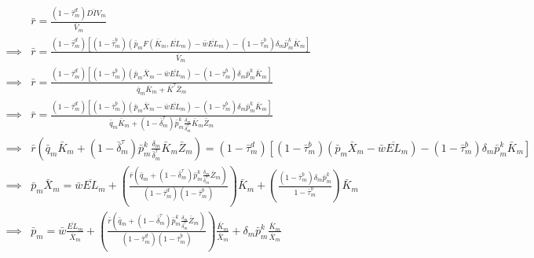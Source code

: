 \documentclass[letterpaper,12pt]{article}
\theoremstyle{definition}
\begin{document}
\begin{spacing}{1.5}
 \begin{equation}
 \label{eqn:p_dynamic_tax_ss}
\begin{split}
& \bar{r}  =  \frac{(1-\bar{\tau}^{d}_{m})\overline{DIV}_{m}}{\bar{V}_{m}} \\
\implies &  \bar{r}  =  \frac{(1-\bar{\tau}^{d}_{m})\left[(1-\bar{\tau}^{b}_{m})\left(\bar{p}_{m}F(\bar{K}_{m},\overline{EL}_{m}) - \bar{w}\overline{EL}_{m}\right) - (1-\bar{\tau}^{b}_{m})\delta_{m}\bar{p}^{k}_{m}\bar{K}_{m}\right]}{\bar{V}_{m}} \\
\implies &  \bar{r}  =  \frac{(1-\bar{\tau}^{d}_{m})\left[(1-\bar{\tau}^{b}_{m})\left(\bar{p}_{m}\bar{X}_{m} - \bar{w}\overline{EL}_{m}\right) - (1-\bar{\tau}^{b}_{m})\delta_{m}\bar{p}^{k}_{m}\bar{K}_{m}\right]}{\bar{q}_{m}\bar{K}_{m}+\bar{K}^{\tau} \bar{Z}_{m}} \\
\implies &  \bar{r}  =  \frac{(1-\bar{\tau}^{d}_{m})\left[(1-\bar{\tau}^{b}_{m})\left(\bar{p}_{m}\bar{X}_{m} - \bar{w}\overline{EL}_{m}\right) - (1-\bar{\tau}^{b}_{m})\delta_{m}\bar{p}^{k}_{m}\bar{K}_{m}\right]}{\bar{q}_{m}\bar{K}_{m}+(1-\bar{\delta}^{\tau}_{m})\bar{p}^{k}_{m}\frac{\delta_{m}}{\bar{\delta}^{\tau}_{m}}\bar{K}_{m} \bar{Z}_{m}} \\
\implies &  \bar{r}\left(\bar{q}_{m}\bar{K}_{m}+(1-\bar{\delta}^{\tau}_{m})\bar{p}^{k}_{m}\frac{\delta_{m}}{\bar{\delta}^{\tau}_{m}}\bar{K}_{m} \bar{Z}_{m} \right)  =  (1-\bar{\tau}^{d}_{m})\left[(1-\bar{\tau}^{b}_{m})\left(\bar{p}_{m}\bar{X}_{m} - \bar{w}\overline{EL}_{m}\right) - (1-\bar{\tau}^{b}_{m})\delta_{m}\bar{p}^{k}_{m}\bar{K}_{m}\right] \\
\implies &  \bar{p}_{m}\bar{X}_{m} = \bar{w}\overline{EL}_{m} + \left(\frac{\bar{r}\left(\bar{q}_{m}+(1-\bar{\delta}^{\tau}_{m})\bar{p}^{k}_{m}\frac{\delta_{m}}{\bar{\delta}^{\tau}_{m}} \bar{Z}_{m} \right)}{(1-\bar{\tau}^{d}_{m})(1-\bar{\tau}^{b}_{m})}\right)\bar{K}_{m} + \left(\frac{(1-\bar{\tau}^{b}_{m})\delta_{m}\bar{p}^{k}_{m}}{1-\bar{\tau}^{b}_{m}}\right)\bar{K}_{m} \\
\implies &  \bar{p}_{m} = \bar{w}\frac{\overline{EL}_{m}}{\bar{X}_{m}} +  \left(\frac{\bar{r}\left(\bar{q}_{m}+(1-\bar{\delta}^{\tau}_{m})\bar{p}^{k}_{m}\frac{\delta_{m}}{\bar{\delta}^{\tau}_{m}} \bar{Z}_{m} \right)}{(1-\bar{\tau}^{d}_{m})(1-\bar{\tau}^{b}_{m})}\right)\frac{\bar{K}_{m}}{\bar{X}_{m}} + \delta_{m}\bar{p}^{k}_{m}\frac{\bar{K}_{m}}{\bar{X}_{m}} \\
\end{split}
\end{equation}


\end{spacing}
\end{document}
